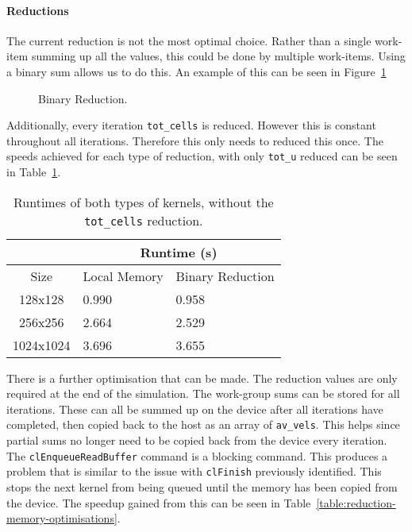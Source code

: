 



\paragraph{Reductions}
The current reduction is not the most optimal choice. Rather than a single work-item summing up all the values, this could be done by multiple work-items. Using a binary sum allows us to do this. An example of this can be seen in Figure~\ref{fig:binary-reduction}

\begin{figure}[ht]
\centering

\vspace{-3mm}
\caption{Binary Reduction.}
\label{fig:binary-reduction}
\vspace{-2mm}
\end{figure}


Additionally, every iteration \texttt{tot\_cells} is reduced. However this is constant throughout all iterations. Therefore this only needs to reduced this once.  The speeds achieved for each type of reduction, with only \texttt{tot\_u} reduced can be seen in Table~\ref{table:reductions}.


\begin{table}[ht]
\vspace{-5mm}
\centering
\caption{Runtimes of both types of kernels, without the \texttt{tot\_cells} reduction.}
\vspace{1mm}
\begin{tabular}{|c||p{4.8em}|p{5em}|}
    \hline
    & \multicolumn{2}{|c|}{Runtime (s)}\\
    \hline
    Size & Local Memory & Binary Reduction \\
    \hline
    128x128 & 0.990 & 0.958 \\
    \hline
    256x256 & 2.664 & 2.529 \\
    \hline
    1024x1024 & 3.696 & 3.655 \\
    \hline
\end{tabular}
\label{table:reductions}
\vspace{-1mm}
\end{table}

There is a further optimisation that can be made. The reduction values are only required at the end of the simulation. The work-group sums can be stored for all iterations. These can all be summed up on the device after all iterations have completed, then copied back to the host as an array of \texttt{av\_vels}. This helps since partial sums no longer need to be copied back from the device every iteration. The \texttt{clEnqueueReadBuffer} command is a blocking command. This produces a problem that is similar to the issue with \texttt{clFinish} previously identified. This stops the next kernel from being queued until the memory has been copied from the device. The speedup gained from this can be seen in Table~\ref{table:reduction-memory-optimisations}.

